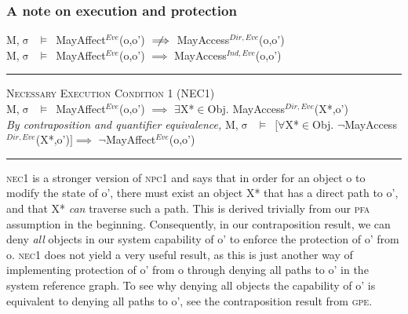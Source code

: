 \documentclass[a4paper,11pt, twoside,twocolumn]{article}
\newenvironment{logic}[1][null]
{\begin{flushleft} \small \label{#1}}
{\end{flushleft}}
\newcommand{\loin}{$\in$}
\newcommand{\loforall}{$\forall$}
\newcommand{\loexists}{$\exists$}
\newcommand{\loimplies}{$\implies$}
\newcommand{\lonimplies}{$\centernot\implies$}
\newcommand{\losigma}{$\upsigma$}
\newcommand{\loturns} {$\vDash$}
\newcommand{\loneg}{$\boldsymbol \neg$}
\newcommand{\ablock} {\null\qquad}
\begin{document}
\subsubsection{A note on execution and protection}
\begin{logic}
M,\losigma\ \loturns\ MayAffect$^{Eve}$(o,o') \lonimplies 
MayAccess$^{Dir,Eve}$(o,o')\linebreak
\\
M,\losigma\ \loturns\ MayAffect$^{Eve}$(o,o') \loimplies 
MayAccess$^{Ind,Eve}$(o,o')
\end{logic}
\begin{logic}
\hrule\null
\textsc{\normalsize *Necessary Execution Condition 1 (NEC1)}\\
M,\losigma\ \loturns\ MayAffect$^{Eve}$(o,o') \loimplies\linebreak
	\ablock \loexists X*\loin{Obj}. MayAccess$^{Dir,Eve}$(X*,o') 
\linebreak\\
\textit{By contraposition and quantifier equivalence,}\linebreak
M,\losigma\ \loturns\ $[$\loforall X*\loin{Obj}. \loneg MayAccess$^{Dir,Eve}$(X*,o')$]$\loimplies\linebreak
	\ablock \loneg MayAffect$^{Eve}$(o,o') \linebreak
\hrule
\end{logic}
\textsc{nec1} is a stronger version of \textsc{npc1} and says that in order for an object o to modify the state of o', there must exist an object X* that has a direct path to o', and that X* \textit{can} traverse such a path. This is derived trivially from our \textsc{pfa} assumption in the beginning. Consequently, in our contraposition result, we can deny \textit{all} objects in our system capability of o' to enforce the protection of o' from o. \textsc{nec1} does not yield a very useful result, as this is just another way of implementing protection of o' from o through denying all paths to o' in the system reference graph. To see why denying all objects the capability of o' is equivalent to denying all paths to o', see the contraposition result from \textsc{gpe}.\\
\end{document}
